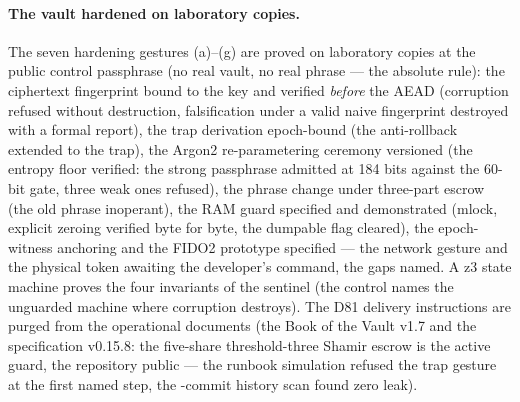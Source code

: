 \documentclass[10pt,a4paper]{article}
\begin{document}
\paragraph{The vault hardened on laboratory copies.} The seven
hardening gestures (a)--(g) are proved on laboratory copies at the
public control passphrase (no real vault, no real phrase --- the
absolute rule): the ciphertext fingerprint bound to the key and
verified \emph{before} the AEAD (corruption refused without
destruction, falsification under a valid naive fingerprint destroyed
with a formal report), the trap derivation epoch-bound (the
anti-rollback extended to the trap), the Argon2 re-parametering
ceremony versioned (the entropy floor verified: the strong passphrase
admitted at 184 bits against the 60-bit gate, three weak ones
refused), the phrase change under three-part escrow (the old phrase
inoperant), the RAM guard specified and demonstrated (mlock,
explicit zeroing verified byte for byte, the dumpable flag cleared),
the epoch-witness anchoring and the FIDO2 prototype specified --- the
network gesture and the physical token awaiting the developer's
command, the gaps named. A z3 state machine proves the four
invariants of the sentinel (the control names the unguarded machine
where corruption destroys). The D81 delivery instructions are
purged from the operational documents (the Book of the Vault v1.7
and the specification v0.15.8: the five-share threshold-three Shamir
escrow is the active guard, the repository public --- the runbook
simulation refused the
trap gesture at the first named step, the \purgeCommitsScannes{}-commit
history scan found zero leak).
\end{document}

